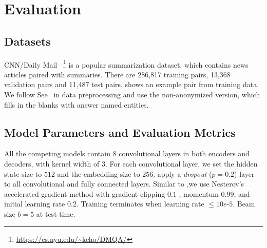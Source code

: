 \section{Evaluation}
\label{sec:eval}
\DIFaddbegin {}\DIFaddend 

\subsection{Datasets}
CNN/Daily Mail~\cite{HermannKGEKSB15}
\footnote{\url{https://cs.nyu.edu/~kcho/DMQA/}} 
is a popular summarization dataset, 
which contains news articles paired with summaries.
There are 286,817 training pairs,
13,368 validation pairs and 11,487 test pairs.
 shows an example pair from training data.
We follow See~\cite{SeeLM17} in data preprocessing and use 
the non-anonymized version, which fills in the blanks with answer named entities.


\subsection{Model Parameters and Evaluation Metrics}
\label{sec:expset}
All the competing models contain $8$ convolutional layers in
both encoders and decoders, with kernel width of $3$.
For each convolutional layer, 
we set the hidden state size to $512$ and the embedding size to $256$.
\DIFdelbegin {}\DIFdelend \DIFaddbegin {}\DIFaddend apply a \textit{dropout} ($p=0.2$) layer to 
all convolutional and fully connected layers.
Similar to \cite{gehring2017convs2s},we use Nesterov's
accelerated gradient method \cite{SutskeverMDH13} with gradient clipping $0.1$ \cite{PascanuMB13}, momentum $0.99$,
and initial learning rate $0.2$.
Training terminates when learning rate $\le 10e$-$5$.
Beam size $b=5$ at test time.

